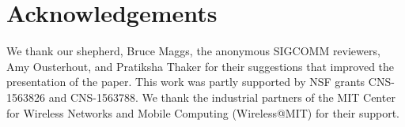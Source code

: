 \section*{Acknowledgements}
We thank our shepherd, Bruce Maggs, the anonymous SIGCOMM reviewers, Amy
Ousterhout, and Pratiksha Thaker for their suggestions
that improved the presentation of the paper. This work was partly supported by
NSF grants CNS-1563826 and CNS-1563788. We thank the industrial partners of the
MIT Center for Wireless Networks and Mobile Computing (Wireless@MIT) for their
support.
